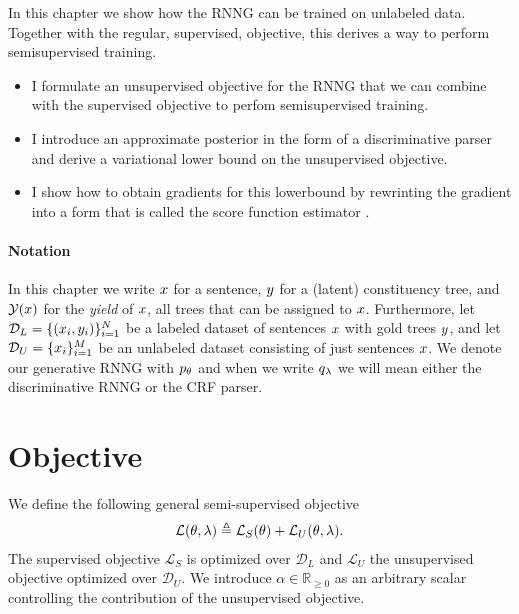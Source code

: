 % 

In this chapter we show how the RNNG can be trained on unlabeled data. Together with the regular, supervised, objective, this derives a way to perform semisupervised training.
\begin{itemize}
  \item I formulate an unsupervised objective for the RNNG that we can combine with the supervised objective to perfom semisupervised training.
  \item I introduce an approximate posterior in the form of a discriminative parser and derive a variational lower bound on the unsupervised objective.
  \item I show how to obtain gradients for this lowerbound by rewrinting the gradient into a form that is called the score function estimator \citep{williams1992reinforce,fu2006gradient}.
\end{itemize}

\paragraph{Notation} In this chapter we write $x$ for a sentence, $y$ for a (latent) constituency tree, and $\mathcal{Y}(x)$ for the \textit{yield} of $x$, all trees that can be assigned to $x$. Furthermore, let $\mathcal{D}_L = \{ (x_i, y_i)\}_{i=1}^N$ be a labeled dataset of sentences $x$ with gold trees $y$, and let $\mathcal{D}_U = \{ x_i \}_{i=1}^M$ be an unlabeled dataset consisting of just sentences $x$. We denote our generative RNNG with $p_{\theta}$ and when we write $q_{\lambda}$ we will mean either the discriminative RNNG or the CRF parser.

\section{Objective}
We define the following general semi-supervised objective
\begin{align*}
  \mathcal{L}(\theta, \lambda) \triangleq \mathcal{L}_{S}(\theta) + \mathcal{L}_{U}(\theta, \lambda).
\end{align*}
The supervised objective $\mathcal{L}_{S}$ is optimized over $\mathcal{D}_L$ and $\mathcal{L}_{U}$ the unsupervised objective optimized over $\mathcal{D}_U$. We introduce $\alpha \in \mathbb{R}_{\geq 0}$ as an arbitrary scalar controlling the contribution of the unsupervised objective.

